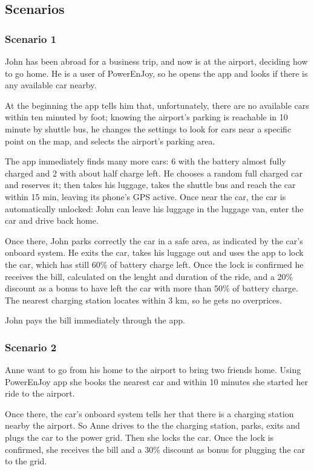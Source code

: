 \documentclass[11pt]{article} %
\newcommand{\pe}{PowerEnJoy }
\newcommand{\pecomma}{PowerEnJoy, }
\begin{document}
\subsection{Scenarios}

\subsubsection{Scenario 1}
John has been abroad for a business trip, and now is at the airport, deciding how to go home. He is a user of \pecomma so  he opens the app and looks if there is any available car nearby. 

At the beginning the app tells him that, unfortunately, there are no available cars within ten minuted by foot; knowing the airport's parking is reachable in 10 minute by shuttle bus, he changes the settings to look for cars near a specific point on the map, and selects the airport's parking area. 

The app immediately finds many more cars: 6 with the battery almost fully charged and 2 with about half charge left. He chooses a random full charged car and reserves it; then takes his luggage, takes the shuttle bus and reach the car within 15 min, leaving its phone's GPS active. Once near the car, the car is automatically unlocked: John can leave his luggage in the luggage van, enter the car and drive back home.

Once there, John parks correctly the car in a safe area, as indicated by the car's onboard system. He exits the car, takes his luggage out and uses the app to lock the car, which has still 60\% of battery charge left. Once the lock is confirmed he receives the bill, calculated on the lenght and duration of the ride, and a 20\% discount as a bonus to have left the car with more than 50\% of battery charge. The nearest charging station locates within 3 km, so he gets no overprices.

John pays the bill immediately through the app.

\subsubsection{Scenario 2}
Anne want to go from his home to the airport to bring two friends home. Using \pe app she books the nearest car and within 10 minutes she started her ride to the airport.

Once there, the car's onboard system tells her that there is a charging station nearby the airport. So Anne drives to the the charging station, parks, exits and plugs the car to the power grid. Then she locks the car. Once the lock is confirmed, she receives the bill and a 30\% discount as bonus for plugging the car to the grid.
\end{document}
